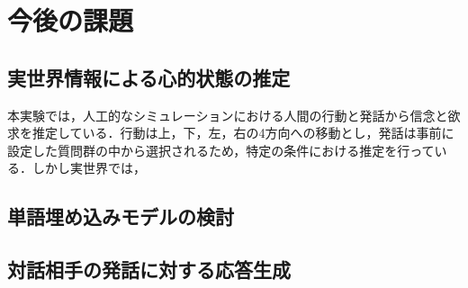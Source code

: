 \chapter{今後の課題}

\section{実世界情報による心的状態の推定}
本実験では，人工的なシミュレーションにおける人間の行動と発話から信念と欲求を推定している．行動は上，下，左，右の4方向への移動とし，発話は事前に設定した質問群の中から選択されるため，特定の条件における推定を行っている．しかし実世界では，

\section{単語埋め込みモデルの検討}



\section{対話相手の発話に対する応答生成}
